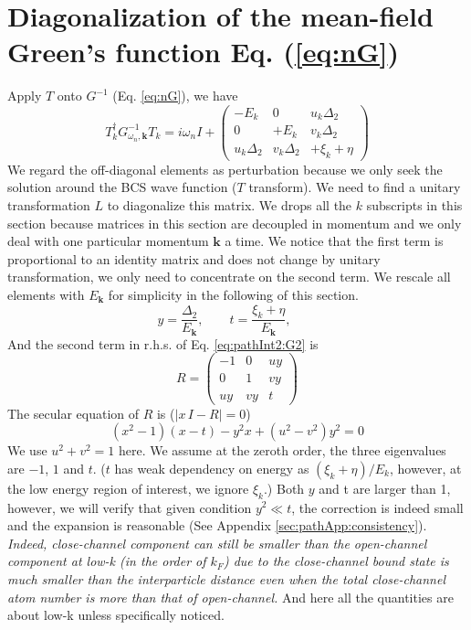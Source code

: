 \documentclass[reprint,pra]{revtex4-1}
\newcommand{\vk}{\ensuremath{\mathbf{k}}}
\providecommand{\abs}[1]{\ensuremath{\left\lvert{#1}\right\rvert}}
\newcommand{\mtrx}[1]{\ensuremath{\begin{pmatrix}#1\end{pmatrix}}}
\newcommand{\dg}{\ensuremath{\dagger}}
\begin{document}
\section{Diagonalization of  the mean-field Green's function Eq. (\ref{eq:nG})\label{sec:diagonalize}}
 Apply $T$ onto $G^{-1}$ (Eq. \ref{eq:nG}), we have 
\begin{equation}\label{eq:pathInt2:G2}
T_k^{\dg}G_{\omega_{n},\vk}^{-1}T_k=i\omega_nI+\mtrx{-E_k&0&u_k\Delta_2\\0&+E_k&v_k\Delta_2\\u_k\Delta_2&v_k\Delta_2&+\xi_k+\eta}
\end{equation}
We regard the off-diagonal elements as perturbation because  we  only seek the solution around the BCS wave function ($T$ transform). 
We need to find a unitary transformation $L$ to diagonalize this  matrix.
We drops all the $k$ subscripts in this section because matrices in this section are decoupled in momentum and we only deal with one particular momentum $\vk$ a time. We notice that the first term is proportional to an identity matrix and does not change by unitary transformation, we only need to concentrate on the second term.  We rescale all elements with $E_{\vk}$ for simplicity in the following of this section. 
\begin{equation*}
y=\frac{\Delta_2}{E_{\vk}},\qquad
 t=\frac{\xi_k+\eta}{E_{\vk}},\qquad
\end{equation*}
 And the second term in r.h.s. of Eq. \ref{eq:pathInt2:G2} is 
\begin{equation*}
R=
\begin{pmatrix}
-1&0&uy\\
0&1&vy\\
uy&vy&t
\end{pmatrix}
\end{equation*}
The secular equation of $R$ is ($\abs{x\,I-R}=0$)
\begin{equation}\label{eq:pahtApp:secular}
(x^{2}-1)(x-t)-y^{2}x+(u^{2}-v^{2})y^{2}=0
\end{equation}
We use $u^{2}+v^{2}=1$ here.  We  assume at the zeroth order, the three eigenvalues are $-1$, $1$ and $t$.  ($t$ has weak dependency on energy as $(\xi_{k}+\eta)/E_{k}$, however, at the low energy region of interest, we ignore $\xi_{k}$.) Both $y$ and t are larger than 1, however, we will verify that given condition $y^{2}\ll{t}$, the correction is indeed small and the expansion is reasonable (See Appendix \ref{sec:pathApp:consistency}).  \emph{Indeed,  close-channel component can still be smaller than the open-channel component at low-k (in the order of $k_{F}$)  due to the close-channel bound state is much smaller than the interparticle distance even when the total close-channel atom number  is more than that of open-channel. }  And here all the quantities are about low-k unless specifically noticed.
\end{document}
